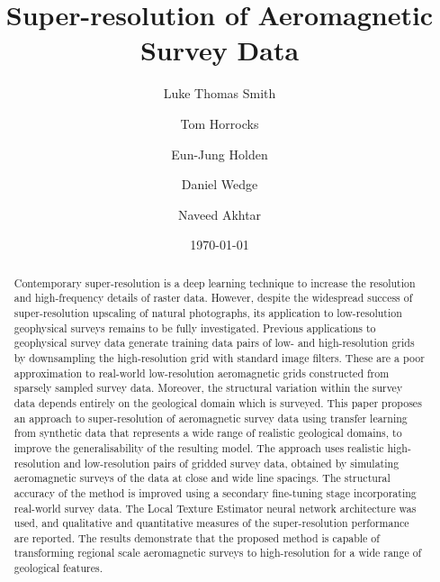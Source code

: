 % 
% 

\title{Super-resolution of Aeromagnetic Survey Data}
\author[1*]{Luke Thomas Smith}
\author[1]{Tom Horrocks}
\author[1]{Eun-Jung Holden}
\author[1]{Daniel Wedge}
\author[2]{Naveed Akhtar}
\date{\today}

\begin{abstract}
    Contemporary super-resolution is a deep learning technique to increase the resolution and high-frequency details of raster data.
    However, despite the widespread success of super-resolution upscaling of natural photographs, its application to low-resolution geophysical surveys remains to be fully investigated.
    Previous applications to geophysical survey data generate training data pairs of low- and high-resolution grids by downsampling the high-resolution grid with standard image filters.
    These are a poor approximation to real-world low-resolution aeromagnetic grids constructed from sparsely sampled survey data.
    Moreover, the structural variation within the survey data depends entirely on the geological domain which is surveyed.
    This paper proposes an approach to super-resolution of aeromagnetic survey data using transfer learning from synthetic data that represents a wide range of realistic geological domains, to improve the generalisability of the resulting model.
    The approach uses realistic high-resolution and low-resolution pairs of gridded survey data, obtained by simulating aeromagnetic surveys of the data at close and wide line spacings.
    The structural accuracy of the method is improved using a secondary fine-tuning stage incorporating real-world survey data.
    The Local Texture Estimator neural network architecture was used, and qualitative and quantitative measures of the super-resolution performance are reported.
    The results demonstrate that the proposed method is capable of transforming regional scale aeromagnetic surveys to high-resolution for a wide range of geological features.
\end{abstract}


